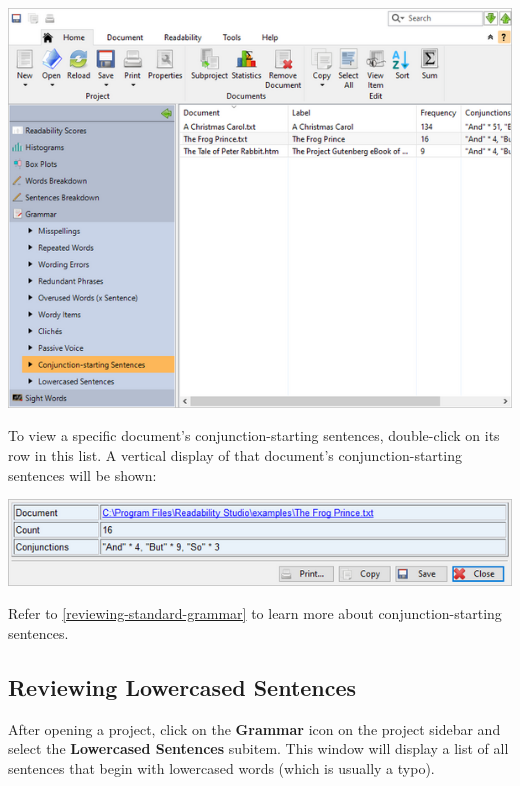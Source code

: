 \documentclass[
]{book}
\theoremstyle{definition}
\theoremstyle{definition}
\theoremstyle{definition}
\theoremstyle{definition}
\theoremstyle{remark}
\begin{document}
\includegraphics{Images/batchconjunctionstart.png}

To view a specific document's conjunction-starting sentences, double-click on its row in this list. A vertical display of that document's conjunction-starting sentences will be shown:

\begin{center}\includegraphics[width=0.75\linewidth,]{Images/batchconjunctionviewitem} \end{center}

Refer to \ref{reviewing-standard-grammar} to learn more about conjunction-starting sentences.

\hypertarget{reviewing-batch-lowercased-sentences}{%
\subsection*{Reviewing Lowercased Sentences}\label{reviewing-batch-lowercased-sentences}}

After opening a project, click on the \textbf{Grammar} icon on the project sidebar and select the \textbf{Lowercased Sentences} subitem. This window will display a list of all sentences that begin with lowercased words (which is usually a typo).
\end{document}
